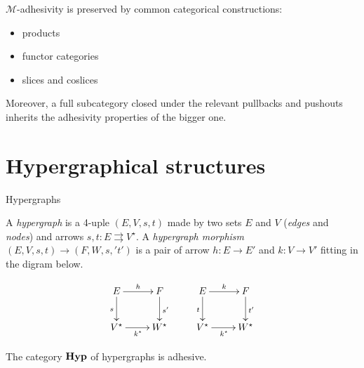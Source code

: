 \documentclass[aspectratio=169]{beamer}
\newcommand{\catname}[1]{\textbf{\textup{#1}}}
\newcommand{\hyp}{\catname{Hyp}}
\begin{document}
\begin{frame}

$\mathcal{M}$-adhesivity is preserved by common categorical constructions:\pause
\begin{itemize}
	\item products\pause 
	\item functor categories \pause
	\item slices and coslices
\end{itemize}

\pause 

Moreover, a full subcategory closed under the relevant pullbacks and pushouts inherits the adhesivity properties of the bigger one.
\end{frame}


\section{Hypergraphical structures }


\begin{frame}{Hypergraphs}

A \emph{hypergraph} is a 4-uple $(E, V, s, t)$ made by two sets $E$ and $V$ (\emph{edges} and \emph{nodes}) and arrows $s, t\colon E \rightrightarrows V^\star$. \pause A \emph{hypergraph morphism} $(E, V, s, t)\to (F, W, s,' t')$  is a pair of arrow $h\colon E\to E'$ and $k\colon V\to V'$ fitting in the digram below.
	
	\[\xymatrix{ E \ar[r]^{h}\ar[d]_{s}& F \ar[d]^{s'} & E \ar[r]^{k} \ar[d]_{t}& F\ar[d]^{t'}\\ V^\star\ar[r]_{k^\star}& W^\star & V^\star \ar[r]_{k^\star}&W^\star}\]
		
	\pause 
\begin{theorem}
	The category $\hyp$ of hypergraphs is adhesive.
\end{theorem}	

\end{frame}
\end{document}
